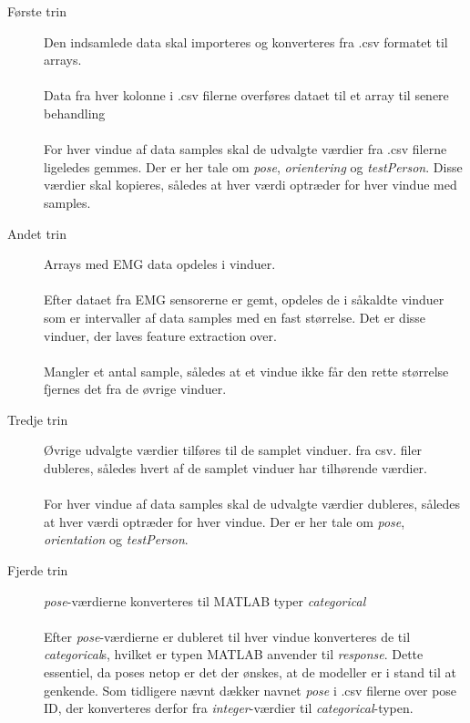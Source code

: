 \begin{description}
	\item[Første trin] Den indsamlede data skal importeres og konverteres fra .csv formatet til arrays.\\\\
		Data fra hver kolonne i .csv filerne overføres dataet til et array til senere behandling
	\\\\
	For hver vindue af data samples skal de udvalgte værdier fra .csv filerne ligeledes gemmes. Der er her tale om \textit{pose}, \textit{orientering} og \textit{testPerson}. Disse værdier skal kopieres, således at hver værdi optræder for hver vindue med samples.

  \item[Andet trin] Arrays med EMG data opdeles i vinduer. 
  \\\\
  Efter dataet fra EMG sensorerne er gemt, opdeles de i såkaldte vinduer som er intervaller af data samples med en fast størrelse. Det er disse vinduer, der laves feature extraction over.
  \\\\
  Mangler et antal sample, således at et vindue ikke får den rette størrelse fjernes det fra de øvrige vinduer. 
    \item[Tredje trin] Øvrige udvalgte værdier tilføres til de samplet vinduer.
     fra csv. filer dubleres, således hvert af de samplet vinduer har tilhørende værdier.
  \\\\
  For hver vindue af data samples skal de udvalgte værdier dubleres, således at hver værdi optræder for hver vindue. Der er her tale om \textit{pose}, \textit{orientation} og \textit{testPerson}.
  
  \item[Fjerde trin] \textit{pose}-værdierne konverteres til MATLAB typer \textit{categorical}
  \\\\
  Efter \textit{pose}-værdierne er dubleret til hver vindue konverteres de til \textit{categorical}s, hvilket er typen MATLAB anvender til \textit{response}. Dette essentiel, da poses netop er det der ønskes, at de modeller er i stand til at genkende. Som tidligere nævnt dækker navnet \textit{pose} i .csv filerne over pose ID, der konverteres derfor fra \textit{integer}-værdier til \textit{categorical}-typen. 
\end{description}
